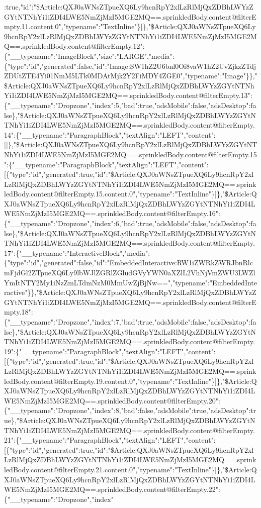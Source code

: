 :true,"id":"\$Article:QXJ0aWNsZTpueXQ6Ly9hcnRpY2xlLzRlMjQxZDBhLWYzZGYtNTNhYi1iZDI4LWE5NmZjMzI5MGE2MQ==.sprinkledBody.content@filterEmpty.11.content.0","typename":"TextInline"\}{]}\},"\$Article:QXJ0aWNsZTpueXQ6Ly9hcnRpY2xlLzRlMjQxZDBhLWYzZGYtNTNhYi1iZDI4LWE5NmZjMzI5MGE2MQ==.sprinkledBody.content@filterEmpty.12":\{"\_\_typename":"ImageBlock","size":"LARGE","media":\{"type":"id","generated":false,"id":"Image:SW1hZ2U6bnl0Oi8vaW1hZ2UvZjkzZTdjZDUtZTE4Yi01NmM5LTk0MDAtMjk2Y2FiMDY4ZGE0","typename":"Image"\}\},"\$Article:QXJ0aWNsZTpueXQ6Ly9hcnRpY2xlLzRlMjQxZDBhLWYzZGYtNTNhYi1iZDI4LWE5NmZjMzI5MGE2MQ==.sprinkledBody.content@filterEmpty.13":\{"\_\_typename":"Dropzone","index":5,"bad":true,"adsMobile":false,"adsDesktop":false\},"\$Article:QXJ0aWNsZTpueXQ6Ly9hcnRpY2xlLzRlMjQxZDBhLWYzZGYtNTNhYi1iZDI4LWE5NmZjMzI5MGE2MQ==.sprinkledBody.content@filterEmpty.14":\{"\_\_typename":"ParagraphBlock","textAlign":"LEFT","content":{[}{]}\},"\$Article:QXJ0aWNsZTpueXQ6Ly9hcnRpY2xlLzRlMjQxZDBhLWYzZGYtNTNhYi1iZDI4LWE5NmZjMzI5MGE2MQ==.sprinkledBody.content@filterEmpty.15":\{"\_\_typename":"ParagraphBlock","textAlign":"LEFT","content":{[}\{"type":"id","generated":true,"id":"\$Article:QXJ0aWNsZTpueXQ6Ly9hcnRpY2xlLzRlMjQxZDBhLWYzZGYtNTNhYi1iZDI4LWE5NmZjMzI5MGE2MQ==.sprinkledBody.content@filterEmpty.15.content.0","typename":"TextInline"\}{]}\},"\$Article:QXJ0aWNsZTpueXQ6Ly9hcnRpY2xlLzRlMjQxZDBhLWYzZGYtNTNhYi1iZDI4LWE5NmZjMzI5MGE2MQ==.sprinkledBody.content@filterEmpty.16":\{"\_\_typename":"Dropzone","index":6,"bad":true,"adsMobile":false,"adsDesktop":false\},"\$Article:QXJ0aWNsZTpueXQ6Ly9hcnRpY2xlLzRlMjQxZDBhLWYzZGYtNTNhYi1iZDI4LWE5NmZjMzI5MGE2MQ==.sprinkledBody.content@filterEmpty.17":\{"\_\_typename":"InteractiveBlock","media":\{"type":"id","generated":false,"id":"EmbeddedInteractive:RW1iZWRkZWRJbnRlcmFjdGl2ZTpueXQ6Ly9lbWJlZGRlZGludGVyYWN0aXZlL2VhNjVmZWU3LWZlYmItNTY2My1iNzZmLTdmNzM0MmUwZjBjNw==","typename":"EmbeddedInteractive"\}\},"\$Article:QXJ0aWNsZTpueXQ6Ly9hcnRpY2xlLzRlMjQxZDBhLWYzZGYtNTNhYi1iZDI4LWE5NmZjMzI5MGE2MQ==.sprinkledBody.content@filterEmpty.18":\{"\_\_typename":"Dropzone","index":7,"bad":true,"adsMobile":false,"adsDesktop":false\},"\$Article:QXJ0aWNsZTpueXQ6Ly9hcnRpY2xlLzRlMjQxZDBhLWYzZGYtNTNhYi1iZDI4LWE5NmZjMzI5MGE2MQ==.sprinkledBody.content@filterEmpty.19":\{"\_\_typename":"ParagraphBlock","textAlign":"LEFT","content":{[}\{"type":"id","generated":true,"id":"\$Article:QXJ0aWNsZTpueXQ6Ly9hcnRpY2xlLzRlMjQxZDBhLWYzZGYtNTNhYi1iZDI4LWE5NmZjMzI5MGE2MQ==.sprinkledBody.content@filterEmpty.19.content.0","typename":"TextInline"\}{]}\},"\$Article:QXJ0aWNsZTpueXQ6Ly9hcnRpY2xlLzRlMjQxZDBhLWYzZGYtNTNhYi1iZDI4LWE5NmZjMzI5MGE2MQ==.sprinkledBody.content@filterEmpty.20":\{"\_\_typename":"Dropzone","index":8,"bad":false,"adsMobile":true,"adsDesktop":true\},"\$Article:QXJ0aWNsZTpueXQ6Ly9hcnRpY2xlLzRlMjQxZDBhLWYzZGYtNTNhYi1iZDI4LWE5NmZjMzI5MGE2MQ==.sprinkledBody.content@filterEmpty.21":\{"\_\_typename":"ParagraphBlock","textAlign":"LEFT","content":{[}\{"type":"id","generated":true,"id":"\$Article:QXJ0aWNsZTpueXQ6Ly9hcnRpY2xlLzRlMjQxZDBhLWYzZGYtNTNhYi1iZDI4LWE5NmZjMzI5MGE2MQ==.sprinkledBody.content@filterEmpty.21.content.0","typename":"TextInline"\}{]}\},"\$Article:QXJ0aWNsZTpueXQ6Ly9hcnRpY2xlLzRlMjQxZDBhLWYzZGYtNTNhYi1iZDI4LWE5NmZjMzI5MGE2MQ==.sprinkledBody.content@filterEmpty.22":\{"\_\_typename":"Dropzone","index"
